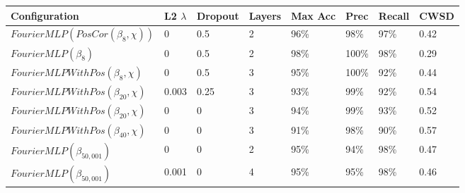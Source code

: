 \documentclass[10pt]{article}
\begin{document}
\begin{minipage}{\textwidth}
    \begin{center}
         \label{fft_wall_cuts}
        \begin{tabular}{|l|l|l|l|l|l|l|l|}
            \hline
            Configuration & L2 $\lambda$ & Dropout & Layers & Max Acc & Prec & Recall & CWSD \\
            \hline
            $FourierMLP(PosCor(\beta_{8}, \chi))$ & 0 & 0.5 & 2 & 96\% & 98\% & 97\% & 0.42 \\
            \hline
            $FourierMLP(\beta_{8})$ & 0 & 0.5 & 2 & 98\% & 100\% & 98\% & 0.29 \\
            \hline
            $FourierMLPWithPos(\beta_{8}, \chi)$ & 0 & 0.5 & 3 & 95\% & 100\% & 92\% & 0.44 \\
            \hline
            $FourierMLPWithPos(\beta_{20}, \chi)$ & 0.003 & 0.25 & 3 & 93\% & 99\% & 92\% & 0.54 \\
            \hline
            $FourierMLPWithPos(\beta_{20}, \chi)$ & 0 & 0 & 3 & 94\% & 99\% & 93\% & 0.52 \\
            \hline
            $FourierMLPWithPos(\beta_{40}, \chi)$ & 0 & 0 & 3 & 91\% & 98\% & 90\% & 0.57 \\
            \hline
            $FourierMLP(\beta_{50,001})$ & 0 & 0 & 2 & 95\% & 94\% & 98\% & 0.47 \\
            \hline
            $FourierMLP(\beta_{50,001})$ & 0.001 & 0 & 4 & 95\% & 95\% & 98\% & 0.46 \\

\end{tabular}
\end{center}
\end{minipage}
\end{document}
